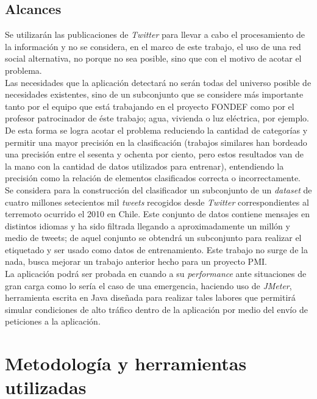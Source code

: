 \subsection{Alcances}
Se utilizarán las publicaciones de \textit{Twitter} para llevar a cabo el procesamiento de la información y no se considera, en el marco de este trabajo, el uso de una red social alternativa, no porque no sea posible, sino que con el motivo de acotar el problema.\\

Las necesidades que la aplicación detectará no serán todas del universo posible de necesidades existentes, sino de un subconjunto que se considere más importante tanto por el equipo que está trabajando en el proyecto FONDEF como por el profesor patrocinador de éste trabajo; agua, vivienda o luz eléctrica, por ejemplo. De esta forma se logra acotar el problema reduciendo la cantidad de categorías y permitir una mayor precisión en la clasificación (trabajos similares han bordeado una precisión entre el sesenta y ochenta por ciento, pero estos resultados van de la mano con la cantidad de datos utilizados para entrenar), entendiendo la precisión como la relación de elementos clasificados correcta o incorrectamente.\\

Se considera para la construcción del clasificador un subconjunto de un \textit{dataset} de cuatro millones setecientos mil \textit{tweets} recogidos desde \textit{Twitter} correspondientes al terremoto ocurrido el 2010 en Chile. Este conjunto de datos contiene mensajes en distintos idiomas y ha sido filtrada llegando a aproximadamente un millón y medio de tweets; de aquel conjunto se obtendrá un subconjunto para realizar el etiquetado y ser usado como datos de entrenamiento. Este trabajo no surge de la nada, busca mejorar un trabajo anterior hecho para un proyecto PMI. \\

La aplicación podrá ser probada en cuando a su \textit{performance} ante situaciones de gran carga como lo sería el caso de una emergencia, haciendo uso de \textit{JMeter}, herramienta escrita en Java diseñada para realizar tales labores que permitirá simular condiciones de alto tráfico dentro de la aplicación por medio del envío de peticiones a la aplicación.


\section{Metodología y herramientas utilizadas}
\label{intro:metodologia}


